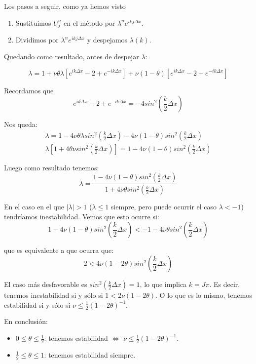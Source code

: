 Los pasos a seguir, como ya hemos visto
\begin{enumerate}
	\item Sustituimos $U_{j}^{n}$ en el método por $\lambda^n e^{ikj\Delta x}$.
	\item Dividimos por $\lambda^n e^{ikj\Delta x}$ y despejamos $\lambda(k)$.
\end{enumerate}

Quedando como resultado, antes de despejar $\lambda$:

$$\lambda = 1+ \nu\theta\lambda\left[e^{ik\Delta x}-2+e^{-ik\Delta x}\right] + \nu(1-\theta)\left[e^{ik\Delta x} - 2 + e^{-ik\Delta x}\right]$$

Recordamos que
$$e^{ik\Delta x}-2+e^{-ik\Delta x} = -4sin^2\left(\frac{k}{2}\Delta x\right)$$

Nos queda:
\begin{align*}
\lambda = 1-4\nu\theta\lambda sin^2\left(\frac{k}{2}\Delta x\right)-4\nu(1-\theta)sin^2\left(\frac{k}{2}\Delta x\right)\\
\lambda\left[1+4\theta\nu sin^2\left(\frac{k}{2}\Delta x\right) \right] = 1 - 4\nu(1-\theta)sin^2\left(\frac{k}{2}\Delta x\right)
\end{align*}

Luego como resultado tenemos:
$$\lambda = \frac{1-4\nu(1-\theta)sin^2\left(\frac{k}{2}\Delta x\right)}{1+4\nu\theta sin^2\left(\frac{k}{2}\Delta x\right)}$$

En el caso en el que $|\lambda|> 1$ ($\lambda \le 1$ siempre, pero puede ocurrir el caso $\lambda < -1$) tendríamos inestabilidad. Vemos que esto ocurre si:
$$1-4\nu(1-\theta)sin^2\left(\frac{k}{2}\Delta x\right) < -1-4\nu\theta sin^2\left(\frac{k}{2}\Delta x\right)$$

que es equivalente a que ocurra que:
$$2 < 4\nu(1-2\theta)sin^2\left(\frac{k}{2}\Delta x\right)$$

El caso más desfavorable es $sin^2\left(\frac{k}{2}\Delta x\right) = 1$, lo que implica $k=J\pi$. Es decir, tenemos inestabilidad si y sólo si $1 < 2\nu(1-2\theta)$. O lo que es lo mismo, tenemos estabilidad si y sólo si $\nu\le \frac{1}{2}(1-2\theta)^{-1}$.

En conclusión:
\begin{itemize}
	\item $0\le\theta\le\frac{1}{2}$: tenemos estabilidad $\iff$ $\nu\le\frac{1}{2}(1-2\theta)^{-1}$.
	\item $\frac{1}{2}\le \theta \le 1$: tenemos estabilidad siempre.
\end{itemize}

